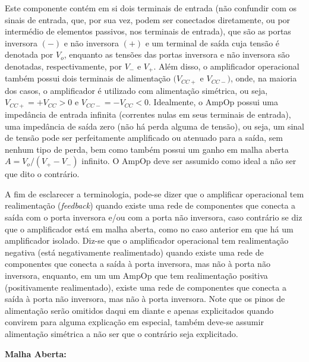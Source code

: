 \documentclass{article}
\numberwithin{equation}{section}
\begin{document}
Este componente contém em si dois terminais de entrada (não confundir com os sinais de entrada, que, por sua vez, podem ser conectados diretamente, ou por intermédio de elementos passivos, nos terminais de entrada), que são as portas inversora $(-)$ e não inversora $(+)$ e um terminal de saída cuja tensão é denotada por $V_o$, enquanto as tensões das portas inversora e não inversora são denotadas, respectivamente, por $V_-$ e $V_+$. Além disso, o amplificador operacional também possui dois terminais de alimentação $(V_{CC+}$ e $V_{CC-})$, onde, na maioria dos casos, o amplificador é utilizado com alimentação simétrica, ou seja, $V_{CC+} = +V_{CC}>0$ e $V_{CC-} = -V_{CC}<0$. Idealmente, o AmpOp possui uma impedância de entrada infinita (correntes nulas em seus terminais de entrada), uma impedância de saída zero (não há perda alguma de tensão), ou seja, um sinal de tensão pode ser perfeitamente amplificado ou atenuado para a saída, sem nenhum tipo de perda, bem como também possui um ganho em malha aberta $A=V_o/(V_+-V_-)$ infinito. O AmpOp deve ser assumido como ideal a não ser que dito o contrário.

A fim de esclarecer a terminologia, pode-se dizer que o amplificar operacional tem realimentação (\textit{feedback}) quando existe uma rede de componentes que conecta a saída com o porta inversora e/ou com a porta não inversora, caso contrário se diz que o amplificador está em malha aberta, como no caso anterior em que há um amplificador isolado. Diz-se que o amplificador operacional tem realimentação negativa (está negativamente realimentado) quando existe uma rede de componentes que conecta a saída à porta inversora, mas não à porta não inversora, enquanto, em um um AmpOp que tem realimentação positiva (positivamente realimentado), existe uma rede de componentes que conecta a saída à porta não inversora, mas não à porta inversora. Note que os pinos de alimentação serão omitidos daqui em diante e apenas explicitados quando convirem para alguma explicação em especial, também deve-se assumir alimentação simétrica a não ser que o contrário seja explicitado.

\vspace{5mm}
\noindent\textbf{Malha Aberta:}

\begin{center}
\end{center}
\end{document}
